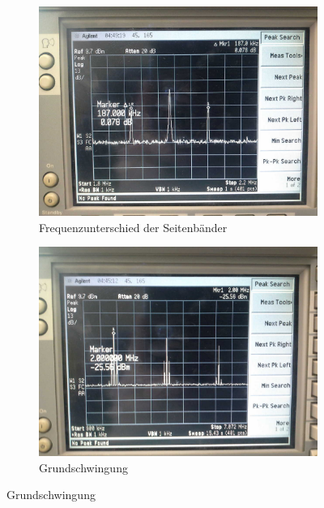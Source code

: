\FloatBarrier
\begin{figure}[!h]
\begin{subfigure}[t]{1\textwidth}
	\centering
	\includegraphics[scale=0.17]{../Grafiken/Frequenzspektrum_c_AmpModuliertTraeger.jpg}
	\caption{Frequenzunterschied der Seitenbänder\label{fig:frequenzspektrum_c_ampmodulierttraeger_differenz}}
\end{subfigure}
\vspace*{0.5cm}
\begin{subfigure}[t]{0.5\textwidth}
	\centering
	\includegraphics[scale=0.17]{../Grafiken/Frequenzspektrum_c_AmpModuliertTraeger_Oberwellen_0.jpg}
	\caption{Grundschwingung\label{fig:frequenzspektrum_c_ampmodulierttraeger_oberwellen_0}}

\end{subfigure}
\end{figure}
